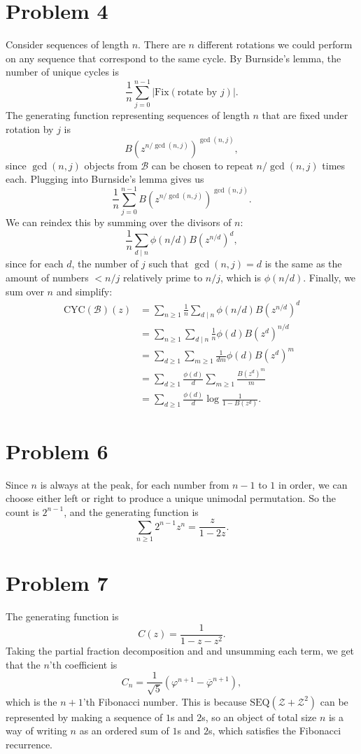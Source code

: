 \documentclass{article}
\newcommand{\mcB}{\mathcal{B}}
\newcommand{\mcZ}{\mathcal{Z}}
\begin{document}
\section*{Problem 4}
Consider sequences of length $n$. There are $n$ different rotations we could perform on any sequence that correspond to the same cycle. By Burnside's lemma, the number of unique cycles is
$$\frac{1}{n}\sum_{j = 0}^{n - 1} |\mathrm{Fix}(\text{rotate by } j)|.$$
The generating function representing sequences of length $n$ that are fixed under rotation by $j$ is
$$B(z^{n/\gcd(n, j)})^{\gcd(n, j)},$$
since $\gcd(n, j)$ objects from $\mcB$ can be chosen to repeat $n/\gcd(n, j)$ times each. Plugging into Burnside's lemma gives us
$$\frac{1}{n} \sum_{j = 0}^{n - 1}B(z^{n/\gcd(n, j)})^{\gcd(n, j)}.$$
We can reindex this by summing over the divisors of $n$:
$$\frac{1}{n} \sum_{d \mid n} \phi(n/d)B(z^{n/d})^d,$$
since for each $d$, the number of $j$ such that $\gcd(n, j) = d$ is the same as the amount of numbers $< n/j$ relatively prime to $n/j$, which is $\phi(n/d)$. Finally, we sum over $n$ and simplify:
\begin{align*}
\mathrm{CYC}(\mcB)(z) &= \sum_{n \ge 1} \frac{1}{n} \sum_{d\mid n} \phi(n/d)B(z^{n/d})^d \\
&= \sum_{n \ge 1} \sum_{d\mid n} \frac{1}{n} \phi(d)B(z^{d})^{n/d} \\
&= \sum_{d \ge 1}\sum_{m \ge 1} \frac{1}{dm} \phi(d)B(z^d)^m \\
&= \sum_{d \ge 1} \frac{\phi(d)}{d}\sum_{m \ge 1} \frac{B(z^d)^m}{m} \\
&= \sum_{d \ge 1} \frac{\phi(d)}{d} \log \frac{1}{1 - B(z^d)}.
\end{align*}

\section*{Problem 6}
Since $n$ is always at the peak, for each number from $n - 1$ to $1$ in order, we can choose either left or right to produce a unique unimodal permutation. So the count is $2^{n - 1}$, and the generating function is
$$\sum_{n \ge 1} 2^{n - 1}z^n = \frac{z}{1 - 2z}.$$

\section*{Problem 7}
The generating function is
$$C(z) = \frac{1}{1 - z - z^2}.$$
Taking the partial fraction decomposition and and unsumming each term, we get that the $n$'th coefficient is
$$C_n = \frac{1}{\sqrt 5} (\varphi^{n + 1} - \overline{\varphi}^{n + 1}),$$
which is the $n + 1$'th Fibonacci number. This is because $\mathrm{SEQ}(\mcZ + \mcZ^2)$ can be represented by making a sequence of $1$s and $2$s, so an object of total size $n$ is a way of writing $n$ as an ordered sum of $1$s and $2$s, which satisfies the Fibonacci recurrence.
\end{document}

